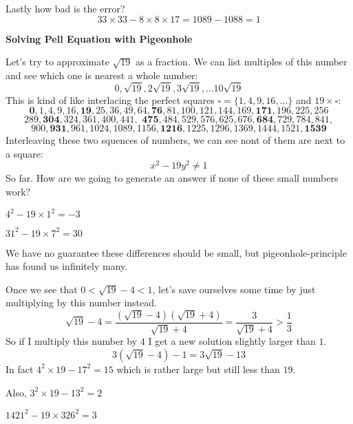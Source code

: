 \documentclass[12pt]{article}
\begin{document}
\noindent Lastly how bad is the error?
$$ 33\times 33 - 8\times 8 \times 17 =
1089 - 1088 = 1 $$
\newpage




\newpage

\noindent \textbf{Solving Pell Equation with Pigeonhole} \newline

\noindent Let's try to approximate $\sqrt{19}$ as a fraction.  We can list multiples of this number and see which one is nearest a whole number:
$$ 0, \sqrt{19}, 
 2\sqrt{19},
  3\sqrt{19},
  \dots
  10 \sqrt{19}
$$ 
This is kind of like interlacing the perfect squares $\square = \{ 1,4,9,16,\dots\}$ and $19 \times \square$:
$$   \textbf{0},    1,    4,    9,   16,   \textbf{19},   25,   36,   49,   64,
         \textbf{76},   81,  100,  121,  144,  169,  \textbf{171},  196,
           225,  256 $$
$$  289,  \textbf{304},  324,  361,  400,  441,  \textbf{ 475},  484,  529,  576,  625,  676,
        \textbf{684},  729,  784,  841, $$
$$900, \textbf{931},  961, 1024, 1089, 1156, \textbf{1216},
       1225, 1296, 1369, 1444, 1521, \textbf{1539} $$
Interleaving these two squences of numbers, we can see nont of them are next to a square:
$$ x^2 - 19y^2 \neq 1 $$
So far.  How are we going to generate an answer if none of these small numbers work?
\newline

\noindent $4^2 - 19 \times 1^2 = -3 $\newline

\noindent $31^2 - 19 \times 7^2 = 30 $ \newline

\noindent We have no guarantee these differences should be small, but pigeonhole-principle has found us infinitely many. \newline

\noindent Once we see that $ 0 < \sqrt{19} - 4 < 1 $, let's save ourselves some time by just multiplying by this number instead.
$$ \sqrt{19} -4 = \frac{(\sqrt{19} -4)(\sqrt{19} +4)}{\sqrt{19} +4} = \frac{3}{\sqrt{19} +4} > \frac{1}{3}$$
So if I multiply this number by $4$ I get a new solution slightly larger than $1$. 
$$ 3(\sqrt{19} - 4)-1 = 3 \sqrt{19} - 13$$
In fact $4^2 \times 19 - 17^2 = 15$ which is rather large but still less than $19$.\newline

\noindent Also, $3^2 \times 19 - 13^2 = 2$

\newpage

\noindent $ 1421^2 - 19 \times 326^2 = 3$ \newline
\end{document}
